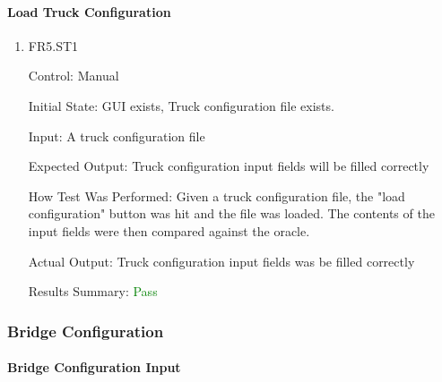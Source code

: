 \documentclass[12pt, titlepage]{article}
\begin{document}
\paragraph{Load Truck Configuration}

\begin{enumerate}

  \item{FR5.ST1\\}

  Control: Manual

  Initial State: GUI exists, Truck configuration file exists.

  Input: A truck configuration file

  Expected Output: Truck configuration input fields will be filled correctly

  How Test Was Performed: Given a truck configuration file, the "load configuration" button was hit and the file was loaded. The contents of the input fields were then compared against the oracle.

  Actual Output: Truck configuration input fields was be filled correctly

  Results Summary: \textcolor{green} {Pass}

\end{enumerate}

\subsubsection{Bridge Configuration}

\paragraph{Bridge Configuration Input}
\end{document}
